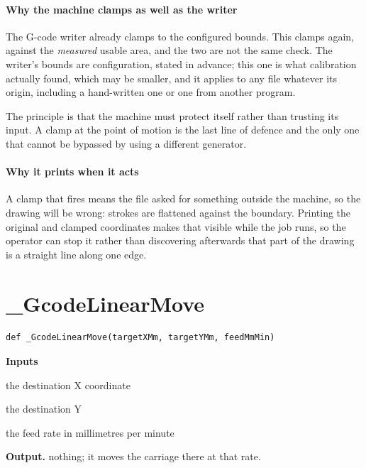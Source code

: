 \paragraph{Why the machine clamps as well as the writer}
The G-code writer already clamps to the configured bounds. This clamps again, against the \emph{measured} usable area, and the two are not the same check. The writer's bounds are configuration, stated in advance; this one is what calibration actually found, which may be smaller, and it applies to any file whatever its origin, including a hand-written one or one from another program.

The principle is that the machine must protect itself rather than trusting its input. A clamp at the point of motion is the last line of defence and the only one that cannot be bypassed by using a different generator.


\paragraph{Why it prints when it acts}
A clamp that fires means the file asked for something outside the machine, so the drawing will be wrong: strokes are flattened against the boundary. Printing the original and clamped coordinates makes that visible while the job runs, so the operator can stop it rather than discovering afterwards that part of the drawing is a straight line along one edge.


\section{\_GcodeLinearMove}
\begin{lstlisting}[style=sig]
def _GcodeLinearMove(targetXMm, targetYMm, feedMmMin)
\end{lstlisting}

\noindent\textbf{Inputs}
\begin{description}[leftmargin=2.2em,style=nextline,font=\normalfont\ttfamily]\setlength\itemsep{1pt}
  \item[{targetXMm}] \normalfont the destination X coordinate
  \item[{targetYMm}] \normalfont the destination Y
  \item[{feedMmMin}] \normalfont the feed rate in millimetres per minute
\end{description}

\noindent\textbf{Output.} nothing; it moves the carriage there at that rate.


